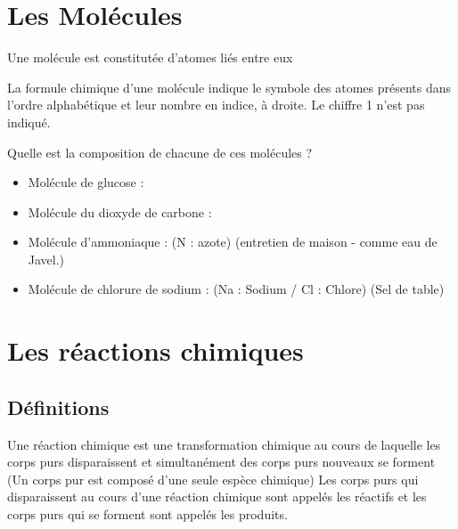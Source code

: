 \documentclass[a4paper,12pt]{article}
\begin{document}
\section{Les Molécules}

\begin{tcolorbox}[colback=green!10!white, colframe=green!75!black, title=Définition : Molécule]
    Une molécule est constitutée d'atomes liés entre eux
\end{tcolorbox}

La formule chimique d'une molécule indique le symbole des atomes présents dans l'ordre alphabétique et leur nombre en indice, à droite. Le chiffre 1 n'est pas indiqué.


\begin{tcolorbox}[colback=blue!10!white, colframe=blue!75!black, title=Exemples - Application]
  Quelle est la composition de chacune de ces molécules ?
  \begin{itemize}[noitemsep]
    \item Molécule de glucose :  
    \item Molécule du dioxyde de carbone : 
    \item Molécule d'ammoniaque :  (N : azote) (entretien de maison - comme eau de Javel.)
    \item Molécule de chlorure de sodium :  (Na  : Sodium / Cl : Chlore) (Sel de table)
  \end{itemize}
\end{tcolorbox}


\section{Les réactions chimiques}

\subsection{Définitions}

\begin{tcolorbox}[colback=green!10!white, colframe=green!75!black, title=Structure de l'atome]
  Une réaction chimique est une transformation chimique au cours de laquelle les corps purs disparaissent et simultanément des corps purs nouveaux se forment (Un corps pur est composé d'une seule espèce chimique)
  Les corps purs qui disparaissent au cours d’une réaction chimique sont appelés les réactifs et les corps purs qui se forment sont appelés les produits.
\end{tcolorbox}
\end{document}
